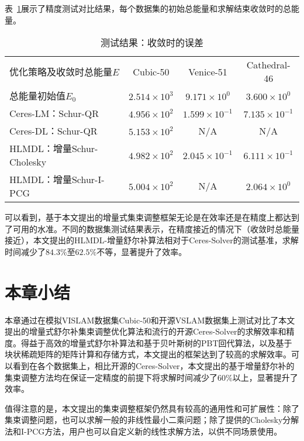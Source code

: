 表~\ref{tab:energy}展示了精度测试对比结果，每个数据集的初始总能量和求解结束收敛时的总能量。

{
\linespread{1}
\begin{table}[htb!]
\caption{测试结果：收敛时的误差}
\label{tab:energy}
\centering
\begin{tabular}[b]{l|ccc}
    \toprule
    优化策略及收敛时总能量$E$ &          Cubic-50 &            Venice-51 &         Cathedral-46 \\
    总能量初始值$E_0$         & $2.514\times10^3$ &  $9.171\times10^{0}$ &  $3.600\times10^{0}$ \\ \midrule
    Ceres-LM：Schur-QR        & $4.956\times10^2$ & $1.599\times10^{-1}$ & $7.135\times10^{-1}$ \\
    Ceres-DL：Schur-QR        & $5.153\times10^2$ &                  N/A &                  N/A \\
    HLMDL：增量Schur-Cholesky & $4.982\times10^2$ & $2.045\times10^{-1}$ & $6.111\times10^{-1}$ \\
    HLMDL：增量Schur-I-PCG    & $5.004\times10^2$ &                  N/A &  $2.064\times10^{0}$ \\
    \bottomrule
\end{tabular}
\end{table}
}

可以看到，基于本文提出的增量式集束调整框架无论是在效率还是在精度上都达到了可用的水准。不同的数据集测试结果表示，在精度接近的情况下（收敛时总能量接近），本文提出的HLMDL-增量舒尔补算法相对于Ceres-Solver的测试基准，求解时间减少了$84.3\%$至$62.5\%$不等，显著提升了效率。

\section{本章小结}

本章通过在模拟VISLAM数据集Cubic-50和开源VSLAM数据集上测试对比了本文提出的增量式舒尔补集束调整优化算法和流行的开源Ceres-Solver的求解效率和精度。得益于高效的增量式舒尔补算法和基于贝叶斯树的PBT回代算法，以及基于块状稀疏矩阵的矩阵计算和存储方式，本文提出的框架达到了较高的求解效率。可以看到在各个数据集上，相比开源的Ceres-Solver，本文提出的基于增量舒尔补的集束调整方法均在保证一定精度的前提下将求解时间减少了$60\%$以上，显著提升了效率。

值得注意的是，本文提出的集束调整框架仍然具有较高的通用性和可扩展性：除了集束调整问题，也可以求解一般的非线性最小二乘问题；除了提供的Cholesky分解法和I-PCG方法，用户也可以自定义新的线性求解方法，以供不同场景使用。

